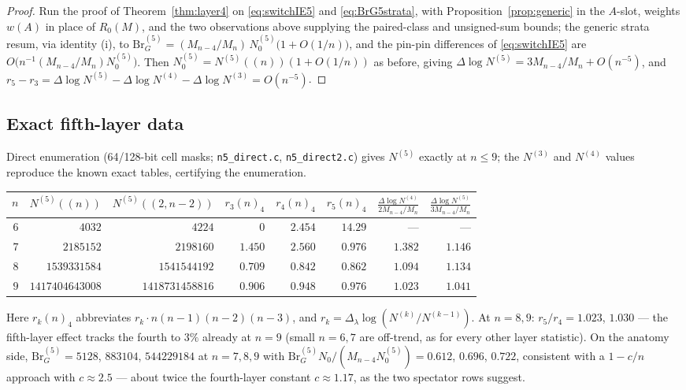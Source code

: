 \documentclass[11pt]{article}
\theoremstyle{definition}
\begin{document}
\begin{proof}
Run the proof of Theorem~\ref{thm:layer4} on \eqref{eq:switchIE5} and
\eqref{eq:BrG5strata}, with Proposition~\ref{prop:generic} in the
$A$-slot, weights $w(A)$ in place of $R_0(M)$, and the two observations
above supplying the paired-class and unsigned-sum bounds; the generic
strata resum, via identity (i), to
$\mathrm{Br}^{(5)}_G=(M_{n-4}/M_n)\,N^{(5)}_0\bigl(1+O(1/n)\bigr)$, and
the pin-pin differences of \eqref{eq:switchIE5} are
$O\bigl(n^{-1}(M_{n-4}/M_n)N^{(5)}_0\bigr)$.  Then
$N^{(5)}_0=N^{(5)}((n))(1+O(1/n))$ as before, giving
$\Delta\log N^{(5)}=3M_{n-4}/M_n+O(n^{-5})$, and
$r_5-r_3=\Delta\log N^{(5)}-\Delta\log N^{(4)}-\Delta\log N^{(3)}
=O(n^{-5})$.
\end{proof}

\subsection{Exact fifth-layer data}

Direct enumeration (64/128-bit cell masks; \texttt{n5\_direct.c},
\texttt{n5\_direct2.c}) gives $N^{(5)}$ exactly at $n\le9$; the $N^{(3)}$
and $N^{(4)}$ values reproduce the known exact tables, certifying the
enumeration.

\begin{center}
\begin{tabular}{r|rr|rrr|rr}
$n$ & $N^{(5)}((n))$ & $N^{(5)}((2,n{-}2))$ &
$r_3(n)_4$ & $r_4(n)_4$ & $r_5(n)_4$ &
$\frac{\Delta\log N^{(4)}}{2M_{n-4}/M_n}$ &
$\frac{\Delta\log N^{(5)}}{3M_{n-4}/M_n}$\\\hline
$6$ & $4032$ & $4224$ & $0$ & $2.454$ & $14.29$ & --- & ---\\
$7$ & $2185152$ & $2198160$ & $1.450$ & $2.560$ & $0.976$ & $1.382$ & $1.146$\\
$8$ & $1539331584$ & $1541544192$ & $0.709$ & $0.842$ & $0.862$ & $1.094$ & $1.134$\\
$9$ & $1417404643008$ & $1418731458816$ & $0.906$ & $0.948$ & $0.976$ & $1.023$ & $1.041$\\
\end{tabular}
\end{center}

\noindent Here $r_k(n)_4$ abbreviates $r_k\cdot n(n{-}1)(n{-}2)(n{-}3)$,
and $r_k=\Delta_\lambda\log(N^{(k)}/N^{(k-1)})$.  At $n=8,9$:
$r_5/r_4=1.023$, $1.030$ --- the fifth-layer effect tracks the fourth
to $3\%$ already at $n=9$ (small $n=6,7$ are off-trend, as for every
other layer statistic).  On the anatomy side,
$\mathrm{Br}^{(5)}_G=5128$, $883104$, $544229184$ at $n=7,8,9$ with
$\mathrm{Br}^{(5)}_G N_0/(M_{n-4}N^{(5)}_0)=0.612$, $0.696$, $0.722$,
consistent with a $1-c/n$ approach with $c\approx2.5$ ---
about twice the fourth-layer constant $c\approx1.17$, as the two
spectator rows suggest.
\end{document}

